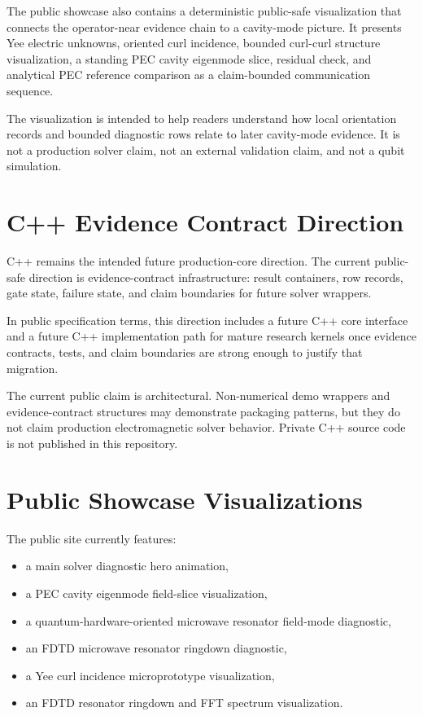 \documentclass[11pt,a4paper]{article}
\begin{document}
The public showcase also contains a deterministic public-safe visualization that connects the operator-near evidence chain to a cavity-mode picture. It presents Yee electric unknowns, oriented curl incidence, bounded curl-curl structure visualization, a standing PEC cavity eigenmode slice, residual check, and analytical PEC reference comparison as a claim-bounded communication sequence.

The visualization is intended to help readers understand how local orientation records and bounded diagnostic rows relate to later cavity-mode evidence. It is not a production solver claim, not an external validation claim, and not a qubit simulation.

\section{C++ Evidence Contract Direction}

C++ remains the intended future production-core direction. The current public-safe direction is evidence-contract infrastructure: result containers, row records, gate state, failure state, and claim boundaries for future solver wrappers.

In public specification terms, this direction includes a future C++ core interface and a future C++ implementation path for mature research kernels once evidence contracts, tests, and claim boundaries are strong enough to justify that migration.

The current public claim is architectural. Non-numerical demo wrappers and evidence-contract structures may demonstrate packaging patterns, but they do not claim production electromagnetic solver behavior. Private C++ source code is not published in this repository.

\section{Public Showcase Visualizations}

The public site currently features:

\begin{itemize}
  \item a main solver diagnostic hero animation,
  \item a PEC cavity eigenmode field-slice visualization,
  \item a quantum-hardware-oriented microwave resonator field-mode diagnostic,
  \item an FDTD microwave resonator ringdown diagnostic,
  \item a Yee curl incidence microprototype visualization,
  \item an FDTD resonator ringdown and FFT spectrum visualization.
\end{itemize}
\end{document}

